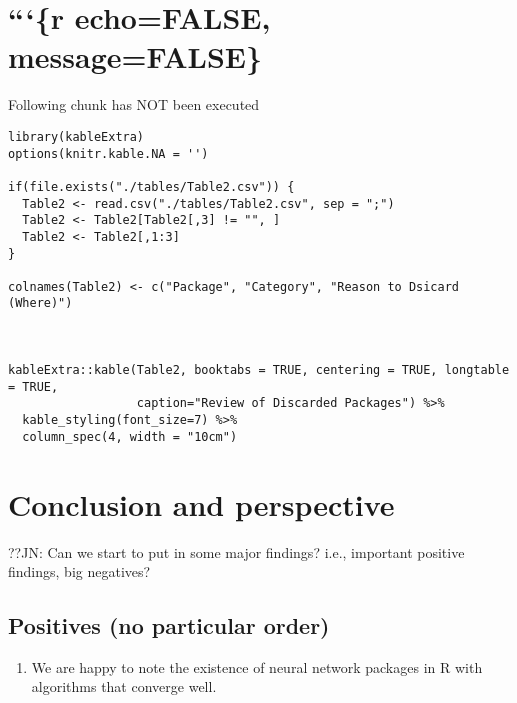 \hypertarget{r-echofalse-messagefalse}{%
\section{```\{r echo=FALSE,
message=FALSE\}}\label{r-echofalse-messagefalse}}

Following chunk has NOT been executed

\begin{verbatim}
library(kableExtra)
options(knitr.kable.NA = '')

if(file.exists("./tables/Table2.csv")) {  
  Table2 <- read.csv("./tables/Table2.csv", sep = ";")
  Table2 <- Table2[Table2[,3] != "", ]
  Table2 <- Table2[,1:3]
}

colnames(Table2) <- c("Package", "Category", "Reason to Dsicard (Where)")



kableExtra::kable(Table2, booktabs = TRUE, centering = TRUE, longtable = TRUE,
                  caption="Review of Discarded Packages") %>%
  kable_styling(font_size=7) %>%
  column_spec(4, width = "10cm")
\end{verbatim}

\hypertarget{conclusion-and-perspective}{%
\section{Conclusion and perspective}\label{conclusion-and-perspective}}

??JN: Can we start to put in some major findings? i.e., important
positive findings, big negatives?

\hypertarget{positives-no-particular-order}{%
\subsection{Positives (no particular
order)}\label{positives-no-particular-order}}

\begin{enumerate}
\def\labelenumi{\arabic{enumi}.}
\tightlist
\item
  We are happy to note the existence of neural network packages in R
  with algorithms that converge well.
\end{enumerate}

